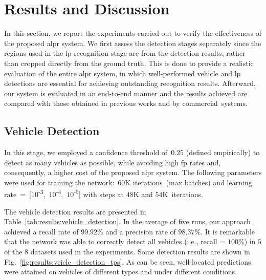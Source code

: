 \section{Results and Discussion}
\label{sec:results}

In this section, we report the experiments carried out to verify the effectiveness of the proposed \gls*{alpr} system.
We first assess the detection stages separately since the regions used in the \gls*{lp} recognition stage are from the detection results, rather than cropped directly from the ground truth.
This is done to provide a realistic evaluation of the entire \gls*{alpr} system, in which well-performed vehicle and \gls*{lp} detections are essential for achieving outstanding recognition results.
Afterward, our system is evaluated in an end-to-end manner and the results achieved are compared with those obtained in previous works and by commercial~systems.

\subsection{Vehicle Detection}
\label{sec:results:vehicle_detection}

In this stage, we employed a confidence threshold of~$0.25$ (defined empirically) to detect as many vehicles as possible, while avoiding high \gls*{fp} rates and, consequently, a higher cost of the proposed \gls*{alpr} system.
The following parameters were used for training the network:~$60$K iterations~(max batches) and learning rate~=~[$10$\textsuperscript{-$3$},~$10$\textsuperscript{-$4$},~$10$\textsuperscript{-$5$}] with steps at $48$K and $54$K~iterations.

The vehicle detection results are presented in Table~\ref{tab:results:vehicle_detection}.
In the average of five runs, our approach achieved a recall rate of $99.92$\% and a precision rate of $98.37$\%. 
It is remarkable that the network was able to correctly detect all vehicles (i.e., recall = $100$\%) in $5$ of the $8$ datasets used in the experiments.
Some detection results are shown in Fig.~\ref{fig:results:veicle_detection_tps}. 
As can be seen, well-located predictions were attained on vehicles of different types and under different conditions.

